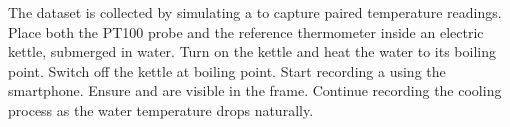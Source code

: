 {}
\markdownRendererSectionEnd 
\markdownRendererSectionEnd 
\markdownRendererSectionEnd 
\markdownRendererSectionEnd \markdownRendererSectionBegin
{}\markdownRendererUlItemEnd 
\markdownRendererUlEndTight \markdownRendererInterblockSeparator
{}The dataset is collected by simulating a  to capture paired temperature readings.\markdownRendererInterblockSeparator
{}\markdownRendererOlBeginTight
{} \markdownRendererOlItemEnd 
\markdownRendererOlEndTight \markdownRendererInterblockSeparator
{}\markdownRendererUlBeginTight
\markdownRendererUlItem Place both the PT100 probe and the reference thermometer inside an electric kettle, submerged in water.\markdownRendererUlItemEnd 
\markdownRendererUlEndTight \markdownRendererInterblockSeparator
{}\markdownRendererOlBeginTight
{} \markdownRendererOlItemEnd 
\markdownRendererOlEndTight \markdownRendererInterblockSeparator
{}\markdownRendererUlBeginTight
\markdownRendererUlItem Turn on the kettle and heat the water to its boiling point.\markdownRendererUlItemEnd 
\markdownRendererUlEndTight \markdownRendererInterblockSeparator
{}\markdownRendererOlBeginTight
{} \markdownRendererOlItemEnd 
\markdownRendererOlEndTight \markdownRendererInterblockSeparator
{}\markdownRendererUlBeginTight
\markdownRendererUlItem Switch off the kettle at boiling point.\markdownRendererUlItemEnd 
\markdownRendererUlItem Start recording a  using the smartphone.\markdownRendererUlItemEnd 
\markdownRendererUlItem Ensure  and  are visible in the frame.\markdownRendererUlItemEnd 
\markdownRendererUlEndTight \markdownRendererInterblockSeparator
{}\markdownRendererOlBeginTight
{} \markdownRendererOlItemEnd 
\markdownRendererOlEndTight \markdownRendererInterblockSeparator
{}\markdownRendererUlBeginTight
\markdownRendererUlItem Continue recording the cooling process as the water temperature drops naturally.\markdownRendererUlItemEnd 
\markdownRendererUlEndTight \markdownRendererInterblockSeparator
{}\markdownRendererOlBeginTight
{} \markdownRendererOlItemEnd 
